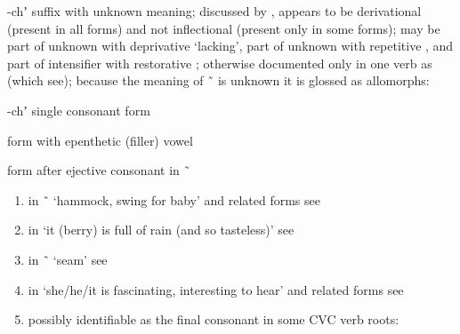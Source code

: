 \begin{morphdesc}[resume*=alphalist]
\item[-chʼ]\label{m:-chʼ}
	suffix with unknown meaning;
	discussed by \textcite[56]{story:1966},
		appears to be derivational (present in all forms)
		and not inflectional (present only in some forms);
	may be part of unknown  with deprivative  ‘lacking’,
		part of unknown  with repetitive ,
		and part of intensifier  with restorative ;
	otherwise documented only in one verb as  (which see);
	because the meaning of  \~\  is unknown it is glossed as 
	\newline
	allomorphs:
	\begin{allolist}
	\item[-chʼ]	single consonant form
	\item[\X{-áchʼ}]	form with epenthetic (filler) vowel 
	\item[\X{-sh}]	form after ejective consonant in  \~\ 
	\end{allolist}
	\begin{enumerate}
	\item	in  \~\  ‘hammock, swing for baby’
		and related forms
		see 
	\item	in  ‘it (berry) is full of rain (and so tasteless)’
		see 
	\item	in  \~\  ‘seam’
		see 
	\item	in  ‘she/he/it is fascinating, interesting to hear’
		and related forms
		see 
	\item	possibly identifiable as the final consonant in some CVC verb roots:
\end{enumerate}
\end{morphdesc}
